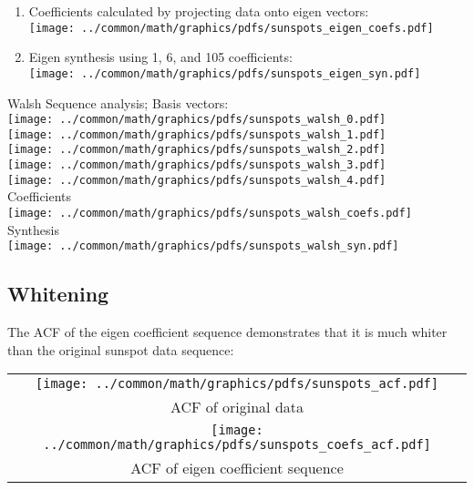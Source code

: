 \begin{example}
\begin{enumerate}
\item Coefficients calculated by projecting data onto eigen vectors:
\\\texttt{[image: ../common/math/graphics/pdfs/sunspots\_eigen\_coefs.pdf]}

\item Eigen synthesis using 1, 6, and 105 coefficients:
\\\texttt{[image: ../common/math/graphics/pdfs/sunspots\_eigen\_syn.pdf]}

\end{enumerate}
\end{example}

\begin{example}
\label{ex:sunspot_period_Walsh}
Walsh Sequence analysis;
Basis vectors:
\\\texttt{[image: ../common/math/graphics/pdfs/sunspots\_walsh\_0.pdf]}
\\\texttt{[image: ../common/math/graphics/pdfs/sunspots\_walsh\_1.pdf]}
\\\texttt{[image: ../common/math/graphics/pdfs/sunspots\_walsh\_2.pdf]}
\\\texttt{[image: ../common/math/graphics/pdfs/sunspots\_walsh\_3.pdf]}
\\\texttt{[image: ../common/math/graphics/pdfs/sunspots\_walsh\_4.pdf]}
\\Coefficients
\\\texttt{[image: ../common/math/graphics/pdfs/sunspots\_walsh\_coefs.pdf]}
\\Synthesis
\\\texttt{[image: ../common/math/graphics/pdfs/sunspots\_walsh\_syn.pdf]}
\end{example}

\subsection{Whitening}
\begin{example}
\label{ex:sunspot_white_Eigen}
The ACF of the eigen coefficient sequence demonstrates that
      it is much whiter than the original sunspot data sequence:
\\\begin{tabular}{|c|}
  \hline
  \texttt{[image: ../common/math/graphics/pdfs/sunspots\_acf.pdf]}
  \\ACF of original data
  \\\hline
  \texttt{[image: ../common/math/graphics/pdfs/sunspots\_coefs\_acf.pdf]}
  \\ACF of eigen coefficient sequence
  \\\hline
\end{tabular}
\end{example}
